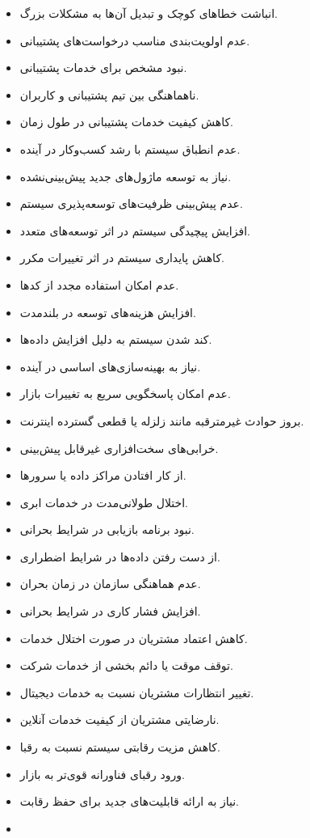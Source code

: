 \documentclass[12pt,a4paper]{report}
\begin{document}
\begin{itemize}
\item
انباشت خطاهای کوچک و تبدیل آن‌ها به مشکلات بزرگ.
\item
عدم اولویت‌بندی مناسب درخواست‌های پشتیبانی.
\item
نبود  مشخص برای خدمات پشتیبانی.
\item
ناهماهنگی بین تیم پشتیبانی و کاربران.
\item
کاهش کیفیت خدمات پشتیبانی در طول زمان.
\item
عدم انطباق سیستم با رشد کسب‌وکار در آینده.
\item
نیاز به توسعه ماژول‌های جدید پیش‌بینی‌نشده.
\item
عدم پیش‌بینی ظرفیت‌های توسعه‌پذیری سیستم.
\item
افزایش پیچیدگی سیستم در اثر توسعه‌های متعدد.
\item
کاهش پایداری سیستم در اثر تغییرات مکرر.
\item
عدم امکان استفاده مجدد از کدها.
\item
افزایش هزینه‌های توسعه در بلندمدت.
\item
کند شدن سیستم به دلیل افزایش داده‌ها.
\item
نیاز به بهینه‌سازی‌های اساسی در آینده.
\item
عدم امکان پاسخگویی سریع به تغییرات بازار.
\item
بروز حوادث غیرمترقبه مانند زلزله یا قطعی گسترده اینترنت.
\item
خرابی‌های سخت‌افزاری غیرقابل پیش‌بینی.
\item
از کار افتادن مراکز داده یا سرورها.
\item
اختلال طولانی‌مدت در خدمات ابری.
\item
نبود برنامه بازیابی در شرایط بحرانی.
\item
از دست رفتن داده‌ها در شرایط اضطراری.
\item
عدم هماهنگی سازمان در زمان بحران.
\item
افزایش فشار کاری در شرایط بحرانی.
\item
کاهش اعتماد مشتریان در صورت اختلال خدمات.
\item
توقف موقت یا دائم بخشی از خدمات شرکت.
\item
تغییر انتظارات مشتریان نسبت به خدمات دیجیتال.
\item
نارضایتی مشتریان از کیفیت خدمات آنلاین.
\item
کاهش مزیت رقابتی سیستم نسبت به رقبا.
\item
ورود رقبای فناورانه قوی‌تر به بازار.
\item
نیاز به ارائه قابلیت‌های جدید برای حفظ رقابت.
\item

\end{itemize}
\end{document}
